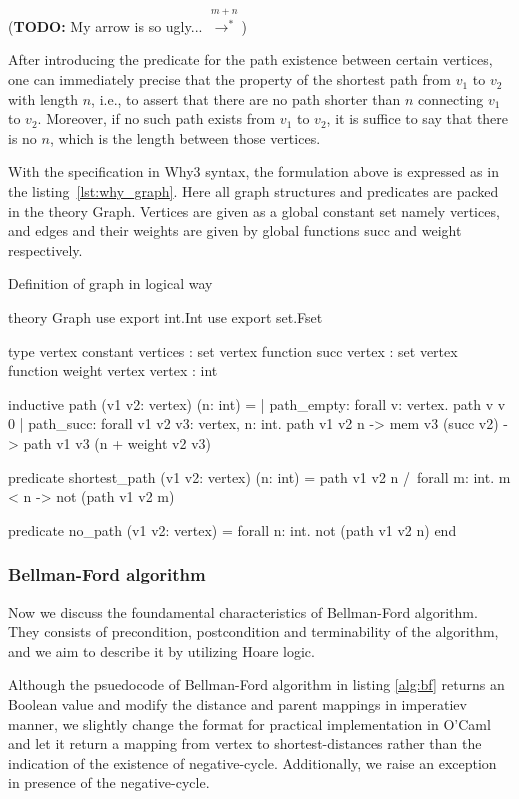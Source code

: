 \documentclass[a4paper,12pt]{article}
\begin{document}
(\textbf{TODO:} My arrow is so ugly... $ \stackrel{m+n}{\longrightarrow^*} $)

After introducing the predicate for the path existence between certain vertices, one can immediately precise that the property of the shortest path from $ v_1 $ to $ v_2 $ with length $ n $, i.e., to assert that there are no path shorter than $ n $ connecting $ v_1 $ to $ v_2 $. Moreover, if no such path exists from $ v_1 $ to $ v_2 $, it is suffice to say that there is no $ n $, which is the length between those vertices.

With the specification in Why3 syntax, the formulation above is expressed as in the listing~\ref{lst:why_graph}. Here all graph structures and predicates are packed in the theory \mbox{\sc Graph}. Vertices are given as a global constant set namely \mbox{\sc vertices}, and edges and their weights are given by global functions \mbox{\sc succ} and \mbox{\sc weight} respectively.

\begin{algorithm}
\caption{Definition of graph in logical way}\label{lst:why_graph}
\begin{why3}[1]
theory Graph
  use export int.Int
  use export set.Fset

  type vertex
  constant vertices : set vertex
  function succ vertex : set vertex
  function weight vertex vertex : int

  inductive path (v1 v2: vertex) (n: int) =
    | path_empty:
        forall v: vertex. path v v 0
    | path_succ:
        forall v1 v2 v3: vertex, n: int.
        path v1 v2 n -> mem v3 (succ v2) -> path v1 v3 (n + weight v2 v3)

  predicate shortest_path (v1 v2: vertex) (n: int) =
    path v1 v2 n /\
    forall m: int. m < n -> not (path v1 v2 m)

  predicate no_path (v1 v2: vertex) =
    forall n: int. not (path v1 v2 n)
end
\end{why3}
\end{algorithm}

\subsubsection{Bellman-Ford algorithm}

Now we discuss the foundamental characteristics of Bellman-Ford algorithm. They consists of precondition, postcondition and terminability of the algorithm, and we aim to describe it by utilizing Hoare logic.

Although the psuedocode of Bellman-Ford algorithm in listing \ref{alg:bf} returns an Boolean value and modify the distance and parent mappings in imperatiev manner, we slightly change the format for practical implementation in O'Caml and let it return a mapping from vertex to shortest-distances rather than the indication of the existence of negative-cycle. Additionally, we raise an exception in presence of the negative-cycle.
\end{document}

